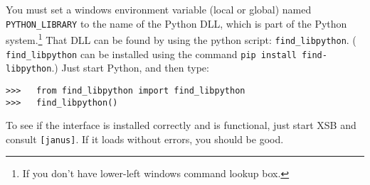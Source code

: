 You must set a windows environment variable (local or global) named
{\tt PYTHON\_LIBRARY} to the name of the Python DLL, which is part of
the Python system.\footnote{If you don't have
lower-left windows command lookup box.}  That DLL can be found by
using the python script: {\tt find\_libpython}.  ({\tt
  find\_libpython} can be installed using the command {\tt pip install
  find-libpython}.)  Just start Python, and then type:
\begin{verbatim}
>>>   from find_libpython import find_libpython
>>>   find_libpython()
\end{verbatim}
To see if the interface is installed correctly and is functional, just
start XSB and consult {\tt [janus]}.  If it loads without errors, you
should be good.


%
%
%

